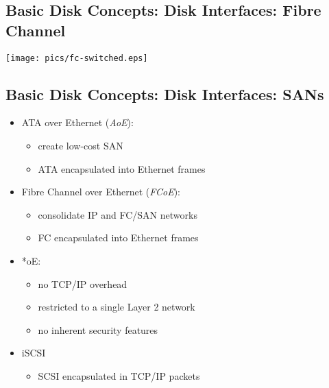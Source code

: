 \documentclass[xga]{xdvislides}
\begin{document}
\subsection{Basic Disk Concepts: Disk Interfaces: Fibre Channel}
\vfill
	\begin{center}
		\texttt{[image: pics/fc-switched.eps]} \\
	\end{center}
\vfill

\subsection{Basic Disk Concepts: Disk Interfaces: SANs}
\begin{itemize}
	\item ATA over Ethernet ({\em AoE}):
		\begin{itemize}
			\item create low-cost SAN
			\item ATA encapsulated into Ethernet frames
		\end{itemize}
	\item Fibre Channel over Ethernet ({\em FCoE}):
		\begin{itemize}
			\item consolidate IP and FC/SAN networks
			\item FC encapsulated into Ethernet frames
		\end{itemize}

	\item *oE:
		\begin{itemize}
			\item no TCP/IP overhead
			\item restricted to a single Layer 2 network
			\item no inherent security features
		\end{itemize}
	\item iSCSI
		\begin{itemize}
			\item SCSI encapsulated in TCP/IP packets
		\end{itemize}
\end{itemize}
\end{document}
